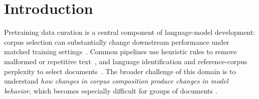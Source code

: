 \documentclass{article} %
\begin{document}
\begin{abstract}
\end{abstract}

\section{Introduction}
\label{sec:intro}

Pretraining data curation is a central component of language-model development: corpus selection can substantially change downstream performance under matched training settings~\citep{penedo2023refinedweb,li2024dclm}. Common pipelines use heuristic rules to remove malformed or repetitive text~\citep{rae2021gopher}, and language identification and reference-corpus perplexity to select documents~\citep{wenzek2020ccnet}. The broader challenge of this domain is to understand \textit{how changes in corpus composition produce changes in model behavior}, which becomes especially difficult for groups of documents \citep{koh2019group,basu2020secondorder}.
\end{document}
